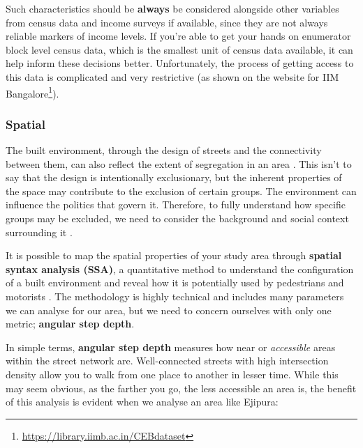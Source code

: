 \documentclass[
]{latex/krantz}
\renewcommand{\href}[2]{#2\footnote{\url{#1}}}
\DeclareRobustCommand{\href}[2]{#2\footnote{\url{#1}}}
\begin{document}
Such characteristics should be \textbf{always} be considered alongside other variables from census data and income surveys if available, since they are not always reliable markers of income levels. If you're able to get your hands on enumerator block level census data, which is the smallest unit of census data available, it can help inform these decisions better. Unfortunately, the process of getting access to this data is complicated and very restrictive (as shown \href{https://library.iimb.ac.in/CEBdataset}{on the website for IIM Bangalore}).

\hypertarget{spatial}{%
\subsubsection*{Spatial}\label{spatial}}


The built environment, through the design of streets and the connectivity between them, can also reflect the extent of segregation in an area \autocite{vlachouSuccessionalSegregationGerani2015}. This isn't to say that the design is intentionally exclusionary, but the inherent properties of the space may contribute to the exclusion of certain groups. The environment can influence the politics that govern it. Therefore, to fully understand how specific groups may be excluded, we need to consider the background and social context surrounding it \autocite{winnerArtifactsHavePolitics1980}.

It is possible to map the spatial properties of your study area through \textbf{spatial syntax analysis (SSA)}, a quantitative method to understand the configuration of a built environment and reveal how it is potentially used by pedestrians and motorists \autocite{dettlaffSpaceSyntaxAnalysis}. The methodology is highly technical and includes many parameters we can analyse for our area, but we need to concern ourselves with only one metric; \textbf{angular step depth}.

In simple terms, \textbf{angular step depth} measures how near or \emph{accessible} areas within the street network are. Well-connected streets with high intersection density allow you to walk from one place to another in lesser time. While this may seem obvious, as the farther you go, the less accessible an area is, the benefit of this analysis is evident when we analyse an area like Ejipura:
\end{document}

